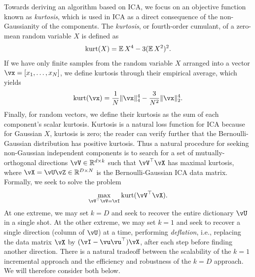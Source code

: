 \documentclass[../../book-main.tex]{subfiles}
\begin{document}
Towards deriving an algorithm based on ICA, we focus on an objective function known as \textit{kurtosis}, which is used in ICA as a direct consequence of the non-Gaussianity of the components. The \textit{kurtosis}, or fourth-order cumulant, of a zero-mean random variable $X$ is defined as
\begin{equation}\label{eq:kurtosis}
\mathop{\mathrm{kurt}}(X) = \operatorname{\mathbb{E}}{X^4} - 3 (\operatorname{\mathbb{E}}{X^2})^2.
\end{equation}
If we have only finite samples from the random variable $X$ arranged into a vector $\vx = [x_1, \dots, x_N]$, we define kurtosis through their empirical average, which yields
\begin{equation}\label{eq:kurtosis-vector}
\kurt(\vx) = \frac{1}{N} \norm{\vx}_4^4 - \frac{3}{N^2} \norm{\vx}_2^4.
\end{equation}
Finally, for random vectors, we define their kurtosis as the sum of each component's scalar kurtosis.
Kurtosis is a natural loss function for ICA because for Gaussian $X$, kurtosis is zero; the reader can verify further that the Bernoulli-Gaussian distribution has positive kurtosis. 
Thus a natural procedure for seeking non-Gaussian independent components is to search for a set of mutually-orthogonal directions $\vV \in \R^{d \times k}$ such that $\vV^\top \vX$ has maximal kurtosis, where $\vX = \vU \vZ \in \R^{D \times N}$ is the Bernoulli-Gaussian ICA data matrix.
Formally, we seek to solve the problem
\begin{equation}
    \max_{\vV^\top \vV = \vI} \kurt(\vV^\top \vX).
\end{equation}
At one extreme, we may set $k = D$ and seek to recover the entire dictionary $\vU$ in a single shot.  At the other extreme, we may set $k=1$ and seek to recover a single direction (column of $\vU$) at a time, performing \textit{deflation}, i.e., replacing the data matrix $\vX$ by $(\vI - \vu\vu^\top) \vX$, after each step before finding another direction.
There is a natural tradeoff between the scalability of the $k=1$ incremental approach and the efficiency and robustness of the $k=D$ approach. We will therefore consider both below.
\end{document}
